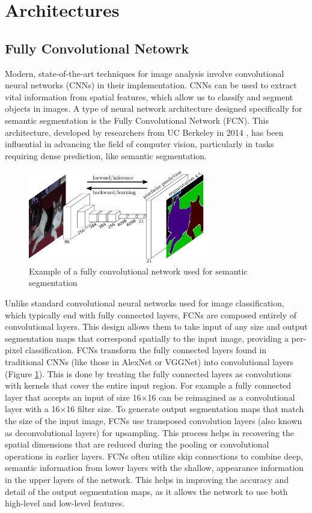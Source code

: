 \section{Architectures}
\subsection{Fully Convolutional Netowrk}

Modern, state-of-the-art techniques for image analysis involve convolutional neural networks (CNNs) in their implementation. CNNs can be used to extract vital information from spatial features, which allow us to classify and segment objects in images. A type of neural network architecture designed specifically for semantic segmentation is the Fully Convolutional Network (FCN). This architecture, developed by researchers from UC Berkeley in 2014 \cite{DBLP:journals/corr/LongSD14}, has been influential in advancing the field of computer vision, particularly in tasks requiring dense prediction, like semantic segmentation. 

\begin{figure}
    \centering 
    \includegraphics[width=0.7\textwidth]{alex-model.pdf}
    \caption{Example of a fully convolutional network used for semantic segmentation \cite{DBLP:journals/corr/LongSD14}}
    \label{fig:fcn-arch}
\end{figure}

Unlike standard convolutional neural networks used for image classification, which typically end with fully connected layers, FCNs are composed entirely of convolutional layers. This design allows them to take input of any size and output segmentation maps that correspond spatially to the input image, providing a per-pixel classification. FCNs transform the fully connected layers found in traditional CNNs (like those in AlexNet or VGGNet) into convolutional layers (Figure \ref{fig:fcn-arch}). This is done by treating the fully connected layers as convolutions with kernels that cover the entire input region. For example a fully connected layer that accepts an input of size 16$\times$16 can be reimagined as a convolutional layer with a 16$\times$16 filter size. To generate output segmentation maps that match the size of the input image, FCNs use transposed convolution layers (also known as deconvolutional layers) for upsampling. This process helps in recovering the spatial dimensions that are reduced during the pooling or convolutional operations in earlier layers. FCNs often utilize skip connections to combine deep, semantic information from lower layers with the shallow, appearance information in the upper layers of the network. This helps in improving the accuracy and detail of the output segmentation maps, as it allows the network to use both high-level and low-level features. 

